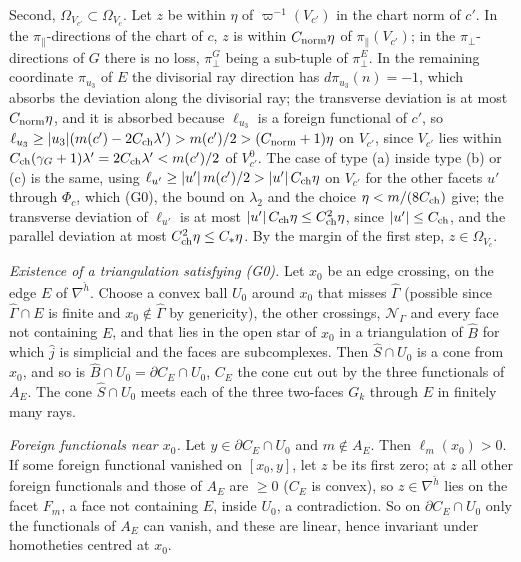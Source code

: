 Second, $\Omega_{V_{c'}}\subset\Omega_{V_c}$. Let $z$ be within $\eta$ of $\varpi^{-1}(V_{c'})$ in the chart norm of $c'$. In the $\pi_\parallel$-directions of the chart of $c$, $z$ is within $C_{\rm norm}\eta$ of $\pi_\parallel(V_{c'})$; in the $\pi_\perp$-directions of $G$ there is no loss, $\pi^G_\perp$ being a sub-tuple of $\pi^E_\perp$. In the remaining coordinate $\pi_{u_3}$ of $E$ the divisorial ray direction has $d\pi_{u_3}(n)=-1$, which absorbs the deviation along the divisorial ray; the transverse deviation is at most $C_{\rm norm}\eta$, and it is absorbed because $\ell_{u_3}$ is a foreign functional of $c'$, so $\ell_{u_3}\ge|u_3|(m(c')-2C_{\rm ch}\lambda')>m(c')/2>(C_{\rm norm}+1)\eta$ on $V_{c'}$, since $V_{c'}$ lies within $C_{\rm ch}(\gamma_G+1)\lambda'=2C_{\rm ch}\lambda'<m(c')/2$ of $V^0_{c'}$. The case of type (a) inside type (b) or (c) is the same, using $\ell_{u'}\ge|u'|\,m(c')/2>|u'|\,C_{\rm ch}\eta$ on $V_{c'}$ for the other facets $u'$ through $\Phi_c$, which (G0), the bound on $\lambda_2$ and the choice $\eta<m/(8C_{\rm ch})$ give; the transverse deviation of $\ell_{u'}$ is at most $|u'|\,C_{\rm ch}\eta\le C_{\rm ch}^2\eta$, since $|u'|\le C_{\rm ch}$, and the parallel deviation at most $C_{\rm ch}^2\eta\le C_*\eta$. By the margin of the first step, $z\in\Omega_{V_c}$.

\emph{Existence of a triangulation satisfying (G0).} Let $x_0$ be an edge crossing, on the edge $E$ of $\nabla^{\check h}$. Choose a convex ball $U_0$ around $x_0$ that misses $\widehat\Gamma$ (possible since $\widehat\Gamma\cap E$ is finite and $x_0\notin\widehat\Gamma$ by genericity), the other crossings, $\mathcal N_\Gamma$ and every face not containing $E$, and that lies in the open star of $x_0$ in a triangulation of $\widehat B$ for which $\hat j$ is simplicial and the faces are subcomplexes. Then $\hat S\cap U_0$ is a cone from $x_0$, and so is $\widehat B\cap U_0=\partial C_E\cap U_0$, $C_E$ the cone cut out by the three functionals of $A_E$. The cone $\hat S\cap U_0$ meets each of the three two-faces $G_k$ through $E$ in finitely many rays.

\emph{Foreign functionals near $x_0$.} Let $y\in\partial C_E\cap U_0$ and $m\notin A_E$. Then $\ell_m(x_0)>0$. If some foreign functional vanished on $[x_0,y]$, let $z$ be its first zero; at $z$ all other foreign functionals and those of $A_E$ are $\ge0$ ($C_E$ is convex), so $z\in\nabla^{\check h}$ lies on the facet $F_m$, a face not containing $E$, inside $U_0$, a contradiction. So on $\partial C_E\cap U_0$ only the functionals of $A_E$ can vanish, and these are linear, hence invariant under homotheties centred at $x_0$.

